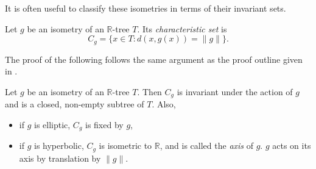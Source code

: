 It is often useful to classify these isometries in terms of their invariant sets.
\begin{definition}
    Let $g$ be an isometry of an $\mathbb{R}$-tree $T$. Its \emph{characteristic set} is \[C_g = \{x\in T:d(x,g(x))=\lVert g \rVert\}.\]
\end{definition}
The proof of the following follows the same argument as the proof outline given in \cite{CullerMorgan}.
\begin{proposition}
    Let $g$ be an isometry of an $\mathbb{R}$-tree $T$. Then $C_g$ is invariant under the action of $g$ and is a closed, non-empty subtree of $T$. Also,
    \begin{itemize}
        \item if $g$ is elliptic, $C_g$ is fixed by $g$,
        \item if $g$ is hyperbolic, $C_g$ is isometric to $\mathbb{R}$, and is called the \emph{axis} of $g$. $g$ acts on its axis by translation by $\lVert g\rVert$.
    \end{itemize}
\end{proposition}
